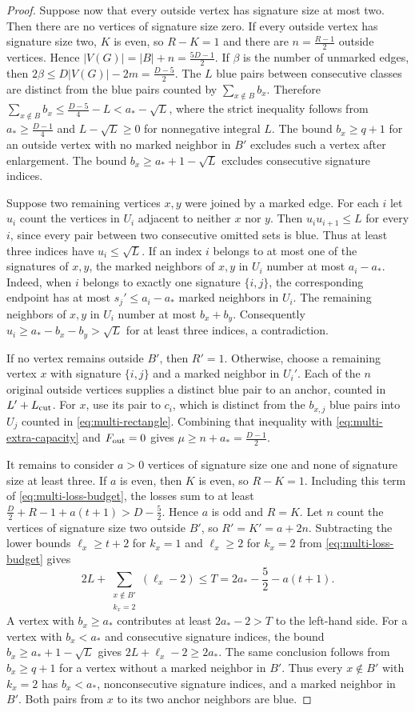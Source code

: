 \documentclass[preprint,11pt,numbers]{elsarticle-arxiv}
\numberwithin{equation}{section}
\theoremstyle{definition}
\begin{document}
\begin{proof}
Suppose now that every outside vertex has signature size at most two.
Then there are no vertices of signature size zero. If every outside
vertex has signature size two, $K$ is even, so $R-K=1$ and there are
$n=\frac{R-1}{2}$ outside vertices. Hence
$|V(G)|=|B|+n=\frac{5D-1}{2}$. If $\beta$ is the number of
unmarked edges, then $2\beta\le D|V(G)|-2m=\frac{D-5}{2}$.
The $L$ blue pairs between consecutive classes are distinct
from the blue pairs counted by $\sum_{x\notin B} b_x$. Therefore
$\sum_{x\notin B} b_x\le \frac{D-5}{4}-L<a_*-\sqrt L$, where
the strict inequality follows from $a_*\ge\frac{D-1}{4}$ and
$L-\sqrt L\ge0$ for nonnegative integral $L$.
The bound $b_x\ge q+1$ for an outside vertex with no marked neighbor
in $B'$ excludes such a vertex after enlargement. The bound
$b_x\ge a_*+1-\sqrt L$ excludes consecutive signature indices.

Suppose two remaining vertices $x,y$ were joined by a marked edge.
For each $i$ let $u_i$ count the vertices in $U_i$ adjacent to
neither $x$ nor $y$. Then $u_i u_{i+1}\le L$ for every $i$,
since every pair between two consecutive omitted sets is blue.
Thus at least three indices have $u_i\le\sqrt L$. If an index $i$
belongs to at most one of the signatures of $x,y$, the marked
neighbors of $x,y$ in $U_i$ number at most $a_i-a_*$.
Indeed, when $i$ belongs to exactly one signature $\{i,j\}$,
the corresponding endpoint has at most $s_j'\le a_i-a_*$
marked neighbors in $U_i$. The remaining neighbors of $x,y$
in $U_i$ number at most $b_x+b_y$. Consequently
$u_i\ge a_*-b_x-b_y>\sqrt L$ for at least three indices,
a contradiction.

If no vertex remains outside $B'$, then $R'=1$. Otherwise, choose
a remaining vertex $x$ with signature $\{i,j\}$ and a marked neighbor
in $U_i'$. Each of the $n$ original outside vertices supplies a
distinct blue pair to an anchor, counted in $L'+L_{\rm cut}$.
For $x$, use its pair to $c_i$, which is distinct from the $b_{x,j}$
blue pairs into $U_j$ counted in \eqref{eq:multi-rectangle}.
Combining that inequality with \eqref{eq:multi-extra-capacity}
and $F_{\rm out}=0$ gives $\mu\ge n+a_*=\frac{D-1}{2}$.

It remains to consider $a>0$ vertices of signature size one and
none of signature size at least three. If $a$ is even, then $K$
is even, so $R-K=1$. Including this term of
\eqref{eq:multi-loss-budget}, the losses sum to at least
$\frac{D}{2}+R-1+a(t+1)>D-\frac{5}{2}$. Hence $a$ is odd and $R=K$.
Let $n$ count the vertices of signature size two outside $B'$,
so $R'=K'=a+2n$. Subtracting the lower bounds $\ell_x\ge t+2$
for $k_x=1$ and $\ell_x\ge2$ for $k_x=2$ from
\eqref{eq:multi-loss-budget} gives
\[
 2L+\sum_{\substack{x\notin B'\\k_x=2}}(\ell_x-2)
 \le T=2a_*-\frac{5}{2}-a(t+1).
\]
A vertex with $b_x\ge a_*$ contributes at least $2a_*-2>T$ to
the left-hand side. For a vertex with $b_x<a_*$ and consecutive
signature indices, the bound $b_x\ge a_*+1-\sqrt L$ gives
$2L+\ell_x-2\ge2a_*$. The same conclusion follows from $b_x\ge q+1$
for a vertex without a marked neighbor in $B'$. Thus every
$x\notin B'$ with $k_x=2$ has $b_x<a_*$, nonconsecutive
signature indices, and a marked neighbor in $B'$. Both pairs
from $x$ to its two anchor neighbors are blue.


\end{proof}
\end{document}
